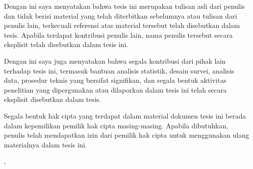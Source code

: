 
Dengan ini saya menyatakan bahwa tesis ini merupakan tulisan asli dari penulis dan tidak berisi material yang telah diterbitkan sebelumnya atau tulisan dari penulis lain, terkecuali referensi atas material tersebut telah disebutkan dalam tesis. Apabila terdapat kontribusi penulis lain, nama penulis tersebut secara eksplisit telah disebutkan dalam tesis ini.

Dengan ini saya juga menyatakan bahwa segala kontribusi dari pihak lain terhadap tesis ini, termasuk bantuan analisis statistik, desain survei, analisis data, prosedur teknis yang bersifat signifikan, dan segala bentuk aktivitas penelitian yang dipergunakan atau dilaporkan dalam tesis ini telah secara eksplisit disebutkan dalam tesis.

Segala bentuk hak cipta yang terdapat dalam material dokumen tesis ini berada dalam kepemilikan pemilik hak cipta masing-masing. Apabila dibutuhkan, penulis telah mendapatkan izin dari pemilik hak cipta untuk menggunakan ulang materialnya dalam tesis ini.

\vfill
\begin{flushleft}
  \kotaTerbit, \tanggalPengesahan\par
  \vspace{24mm}
  \namaMahasiswa
\end{flushleft}
